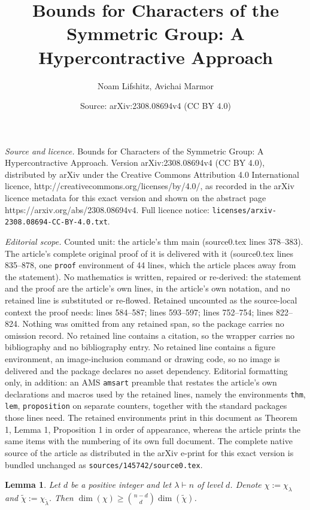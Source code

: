 \documentclass[10pt,a4paper]{amsart}
\title{Bounds for Characters of the Symmetric Group: A Hypercontractive Approach}
\author{Noam Lifshitz, Avichai Marmor}
\date{Source: arXiv:2308.08694v4 (CC BY 4.0)}
\newtheorem{lem}{Lemma}
\renewcommand\ge{\geqslant}
\begin{document}
\maketitle

\noindent\emph{Source and licence.} Bounds for Characters of the Symmetric Group: A Hypercontractive Approach. Version arXiv:2308.08694v4 (CC BY 4.0), distributed by arXiv under the Creative Commons Attribution 4.0 International licence, http://creativecommons.org/licenses/by/4.0/, as recorded in the arXiv licence metadata for this exact version and shown on the abstract page https://arxiv.org/abs/2308.08694v4. Full licence notice: \texttt{licenses/arxiv-2308.08694-CC-BY-4.0.txt}.\par\smallskip

\noindent\textit{Editorial scope.} Counted unit: the article's thm main (source0.tex lines 378--383). The article's complete original proof of it is delivered with it (source0.tex lines 835--878, one \texttt{proof} environment of 44 lines, which the article places away from the statement). No mathematics is written, repaired or re-derived: the statement and the proof are the article's own lines, in the article's own notation, and no retained line is substituted or re-flowed.  Retained uncounted as the source-local context the proof needs: lines 584--587; lines 593--597; lines 752--754; lines 822--824.  Nothing was omitted from any retained span, so the package carries no omission record.  No retained line contains a citation, so the wrapper carries no bibliography and no bibliography entry.  No retained line contains a figure environment, an image-inclusion command or drawing code, so no image is delivered and the package declares no asset dependency.  Editorial formatting only, in addition: an AMS \texttt{amsart} preamble that restates the article's own declarations and macros used by the retained lines, namely the environments \texttt{thm}, \texttt{lem}, \texttt{proposition} on separate counters, together with the standard packages those lines need.  The retained environments print in this document as Theorem 1, Lemma 1, Proposition 1 in order of appearance, whereas the article prints the same items with the numbering of its own full document.  The complete native source of the article as distributed in the arXiv e-print for this exact version is bundled unchanged as \texttt{sources/145742/source0.tex}.
\begin{lem}\label{lem: dimension of characters}
Let $d$ be a positive integer and let $\lambda\vdash n$ of level $d$. Denote $\chi := \chi_\lambda$ and $\tilde{\chi} := \chi_{\tilde{\lambda}}$.
Then $\dim(\chi) \ge \binom{n-d}{d}\dim(\tilde{\chi})$.
\end{lem}
\end{document}
